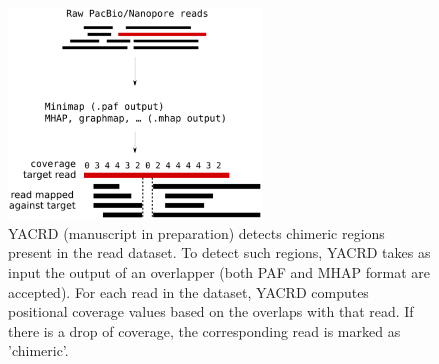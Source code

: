 \documentclass[./main.tex]{subfiles}
\begin{document}
\begin{figure}[!htbp]
    \centering
    \includegraphics[width=0.6\textwidth]{supplemental/knot/yacrd.pdf}
    \caption{YACRD (manuscript in preparation) detects chimeric regions present in the read dataset. To detect such regions, YACRD takes as input the output of an overlapper (both PAF and MHAP format are accepted). For each read in the dataset, YACRD computes positional coverage values based on the overlaps with that read. If there is a drop of coverage, the corresponding read is marked as 'chimeric'.}
    \label{fig:appendix:yacrd}
\end{figure}
\end{document}
